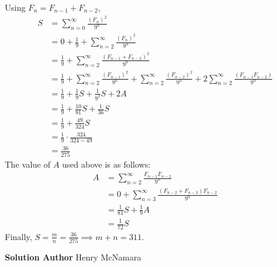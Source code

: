 \documentclass[11pt]{scrartcl}
\newcommand*{\problemfont}{\sffamily\bfseries}
\begin{document}
Using $F_n = F_{n-1} + F_{n-2}$,
\begin{align*}
    S &= \sum_{n=0}^{\infty} \frac{(F_n)^2}{9^n} \\
    &= 0 + \frac19 + \sum_{n=2}^{\infty} \frac{(F_n)^2}{9^n} \\
    &= \frac19 + \sum_{n=2}^{\infty} \frac{(F_{n-1}+F_{n-2})^2}{9^n} \\
    &= \frac19 + \sum_{n=2}^{\infty} \frac{(F_{n-1})^2}{9^n} + \sum_{n=2}^{\infty} \frac{(F_{n-2})^2}{9^n} + 2\sum_{n=2}^{\infty} \frac{(F_{n-1}F_{n-2})}{9^n} \\
    &=\frac19 + \frac19S + \frac{1}{9^2}S + 2A \\
    &=\frac19 + \frac{10}{81}S + \frac{1}{36}S \\
    &= \frac19 + \frac{49}{324}S \\
    &= \frac19 \cdot \frac{324}{324-49} \\
    &= \frac{36}{275}
\end{align*}
The value of $A$ used above is as follows:
\begin{align*}
    A &= \sum_{n=2}^{\infty}\frac{F_{n-1}F_{n-2}}{9^n} \\
    &= 0 + \sum_{n=3}^{\infty}\frac{(F_{n-2} + F_{n-3})F_{n-2}}{9^n} \\
    &= \frac1{81}S + \frac19A \\
    &= \frac1{72}S
\end{align*}
Finally, $S = \frac{m}{n} = \frac{36}{275} \implies m+n = \boxed{311}$. 

\pagebreak

{\problemfont Solution Author} Henry McNamara
\end{document}
